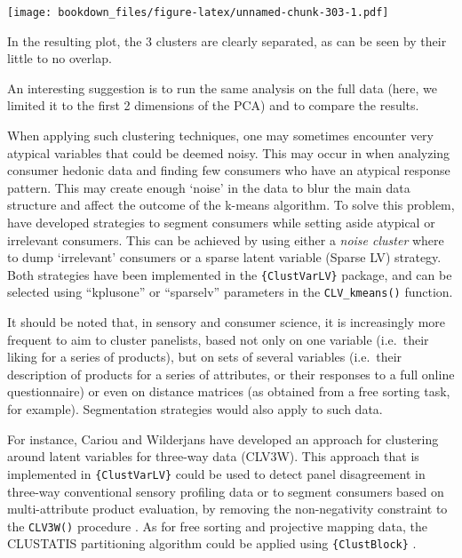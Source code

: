 \documentclass[
]{krantz}
\renewenvironment{quote}{\begin{VF}}{\end{VF}}
\begin{document}
\texttt{[image: bookdown\_files/figure-latex/unnamed-chunk-303-1.pdf]}

In the resulting plot, the 3 clusters are clearly separated, as can be seen by their little to no overlap.

\begin{quote}
An interesting suggestion is to run the same analysis on the full data (here, we limited it to the first 2 dimensions of the PCA) and to compare the results.
\end{quote}

When applying such clustering techniques, one may sometimes encounter very atypical variables that could be deemed noisy. This may occur in when analyzing consumer hedonic data and finding few consumers who have an atypical response pattern. This may create enough `noise' in the data to blur the main data structure and affect the outcome of the k-means algorithm. To solve this problem, \citet{vigneau2016} have developed strategies to segment consumers while setting aside atypical or irrelevant consumers. This can be achieved by using either a \emph{noise cluster} where to dump `irrelevant' consumers or a sparse latent variable (Sparse LV) strategy. Both strategies have been implemented in the \texttt{\{ClustVarLV\}} package, and can be selected using ``kplusone'' or ``sparselv'' parameters in the \texttt{CLV\_kmeans()} function.

It should be noted that, in sensory and consumer science, it is increasingly more frequent to aim to cluster panelists, based not only on one variable (i.e.~their liking for a series of products), but on sets of several variables (i.e.~their description of products for a series of attributes, or their responses to a full online questionnaire) or even on distance matrices (as obtained from a free sorting task, for example). Segmentation strategies would also apply to such data.

For instance, Cariou and Wilderjans have developed an approach for clustering around latent variables for three-way data (CLV3W). This approach that is implemented in \texttt{\{ClustVarLV\}} could be used to detect panel disagreement in three-way conventional sensory profiling data \citep{wilderjans2016} or to segment consumers based on multi-attribute product evaluation, by removing the non-negativity constraint to the \texttt{CLV3W()} procedure \citep{cariou2018}. As for free sorting and projective mapping data, the CLUSTATIS partitioning algorithm could be applied using \texttt{\{ClustBlock\}} \citep[\citet{llobell2020}]{llobell2019}.
\end{document}
